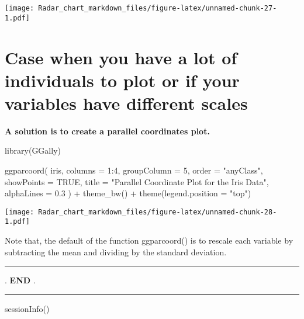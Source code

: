 \documentclass[
]{article}
\newenvironment{Shaded}{\begin{snugshade}}{\end{snugshade}}
\newcommand{\AttributeTok}[1]{\textcolor[rgb]{0.77,0.63,0.00}{#1}}
\newcommand{\ConstantTok}[1]{\textcolor[rgb]{0.00,0.00,0.00}{#1}}
\newcommand{\DecValTok}[1]{\textcolor[rgb]{0.00,0.00,0.81}{#1}}
\newcommand{\FloatTok}[1]{\textcolor[rgb]{0.00,0.00,0.81}{#1}}
\newcommand{\FunctionTok}[1]{\textcolor[rgb]{0.00,0.00,0.00}{#1}}
\newcommand{\NormalTok}[1]{#1}
\newcommand{\SpecialCharTok}[1]{\textcolor[rgb]{0.00,0.00,0.00}{#1}}
\newcommand{\StringTok}[1]{\textcolor[rgb]{0.31,0.60,0.02}{#1}}
\begin{document}
\texttt{[image: Radar\_chart\_markdown\_files/figure-latex/unnamed-chunk-27-1.pdf]}

\hypertarget{case-when-you-have-a-lot-of-individuals-to-plot-or-if-your-variables-have-different-scales}{%
\section{Case when you have a lot of individuals to plot or if your
variables have different
scales}\label{case-when-you-have-a-lot-of-individuals-to-plot-or-if-your-variables-have-different-scales}}

\textbf{A solution is to create a parallel coordinates plot.}

\begin{Shaded}
\begin{Highlighting}[]
\FunctionTok{library}\NormalTok{(GGally)}

\FunctionTok{ggparcoord}\NormalTok{(}
\NormalTok{  iris,}
  \AttributeTok{columns =} \DecValTok{1}\SpecialCharTok{:}\DecValTok{4}\NormalTok{, }\AttributeTok{groupColumn =} \DecValTok{5}\NormalTok{, }\AttributeTok{order =} \StringTok{"anyClass"}\NormalTok{,}
  \AttributeTok{showPoints =} \ConstantTok{TRUE}\NormalTok{, }
  \AttributeTok{title =} \StringTok{"Parallel Coordinate Plot for the Iris Data"}\NormalTok{,}
  \AttributeTok{alphaLines =} \FloatTok{0.3}
\NormalTok{) }\SpecialCharTok{+} 
  \FunctionTok{theme\_bw}\NormalTok{() }\SpecialCharTok{+}
  \FunctionTok{theme}\NormalTok{(}\AttributeTok{legend.position =} \StringTok{"top"}\NormalTok{)}
\end{Highlighting}
\end{Shaded}

\texttt{[image: Radar\_chart\_markdown\_files/figure-latex/unnamed-chunk-28-1.pdf]}

Note that, the default of the function ggparcoord() is to rescale each
variable by subtracting the mean and dividing by the standard deviation.

\begin{center}\rule{0.5\linewidth}{0.5pt}\end{center}

. \textbf{END} .

\begin{center}\rule{0.5\linewidth}{0.5pt}\end{center}

\begin{Shaded}
\begin{Highlighting}[]
\FunctionTok{sessionInfo}\NormalTok{()}
\end{Highlighting}
\end{Shaded}
\end{document}
